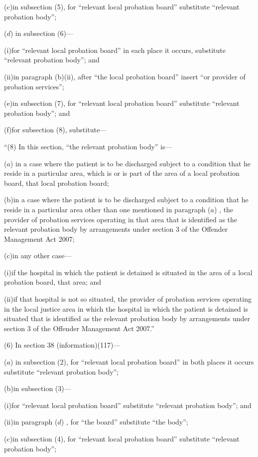 \documentclass[12pt,a4paper]{article}
\begin{document}
(c)in subsection (5), for “relevant local probation board” substitute “relevant probation body”;

($d$) in subsection (6)—

(i)for “relevant local probation board” in each place it occurs, substitute “relevant probation body”; and

(ii)in paragraph (b)(ii), after “the local probation board” insert “or provider of probation services”;

(e)in subsection (7), for “relevant local probation board” substitute “relevant probation body”; and

(f)for subsection (8), substitute—

“(8) In this section, “the relevant probation body” is—

($a$) in a case where the patient is to be discharged subject to a condition that he reside in a particular area, which is or is part of the area of a local probation board, that local probation board;

(b)in a case where the patient is to be discharged subject to a condition that he reside in a particular area other than one mentioned in paragraph ($a$) , the provider of probation services operating in that area that is identified as the relevant probation body by arrangements under section 3 of the Offender Management Act 2007;

(c)in any other case—

(i)if the hospital in which the patient is detained is situated in the area of a local probation board, that area; and

(ii)if that hospital is not so situated, the provider of probation services operating in the local justice area in which the hospital in which the patient is detained is situated that is identified as the relevant probation body by arrangements under section 3 of the Offender Management Act 2007.”

(6) In section 38 (information)(117)—

($a$) in subsection (2), for “relevant local probation board” in both places it occurs substitute “relevant probation body”;

(b)in subsection (3)—

(i)for “relevant local probation board” substitute “relevant probation body”; and

(ii)in paragraph ($d$) , for “the board” substitute “the body”;

(c)in subsection (4), for “relevant local probation board” substitute “relevant probation body”;
\end{document}
